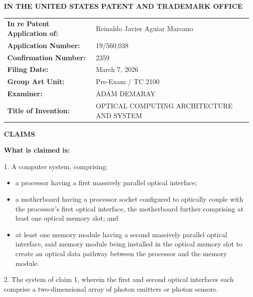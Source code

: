 \documentclass[11pt,letterpaper]{article}
\begin{document}
\thispagestyle{empty}

\begin{center}
    \large\textbf{IN THE UNITED STATES PATENT AND TRADEMARK OFFICE} \\
\end{center}

\vspace{0.2cm}
\noindent\begin{tabular}{p{2.3in}p{4.0in}}
\textbf{In re Patent Application of:} & Reinaldo Javier Aguiar Marcano \\
\textbf{Application Number:} & 19/560,038 \\
\textbf{Confirmation Number:} & 2359 \\
\textbf{Filing Date:} & March 7, 2026 \\
\textbf{Group Art Unit:} & Pre-Exam / TC 2100 \\
\textbf{Examiner:} & ADAM DEMARAY \\
\textbf{Title of Invention:} & OPTICAL COMPUTING ARCHITECTURE AND SYSTEM \\
\end{tabular}

\vspace{0.6cm}
\begin{center}
    \textbf{\large CLAIMS}
\end{center}

\vspace{0.4cm}

\textbf{What is claimed is:}

1. A computer system, comprising:
\begin{itemize}[leftmargin=2.5em]
    \item[] a processor having a first massively parallel optical interface;
    \item[] a motherboard having a processor socket configured to optically couple with the processor’s first optical interface, the motherboard further comprising at least one optical memory slot; and
    \item[] at least one memory module having a second massively parallel optical interface, said memory module being installed in the optical memory slot to create an optical data pathway between the processor and the memory module.
\end{itemize}

2. The system of claim 1, wherein the first and second optical interfaces each comprise a two-dimensional array of photon emitters or photon sensors.
\end{document}
